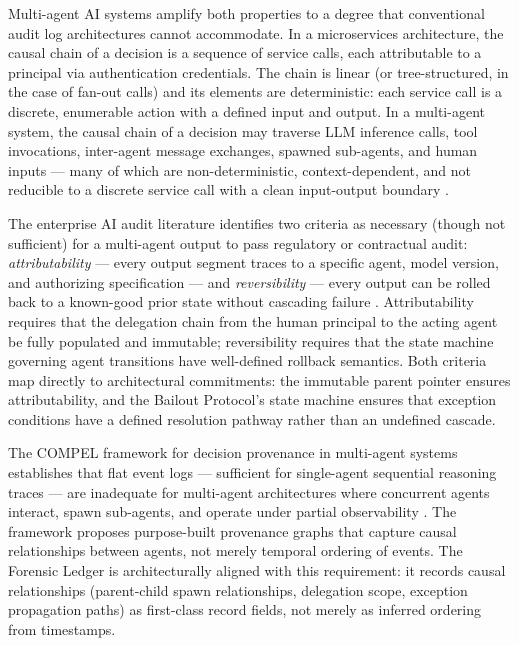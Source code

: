 Multi-agent AI systems amplify both properties to a degree that conventional audit log architectures cannot accommodate. In a microservices architecture, the causal chain of a decision is a sequence of service calls, each attributable to a principal via authentication credentials. The chain is linear (or tree-structured, in the case of fan-out calls) and its elements are deterministic: each service call is a discrete, enumerable action with a defined input and output. In a multi-agent system, the causal chain of a decision may traverse LLM inference calls, tool invocations, inter-agent message exchanges, spawned sub-agents, and human inputs — many of which are non-deterministic, context-dependent, and not reducible to a discrete service call with a clean input-output boundary \cite{arxiv-audit-trails, swept-audit}.

The enterprise AI audit literature identifies two criteria as necessary (though not sufficient) for a multi-agent output to pass regulatory or contractual audit: \emph{attributability} — every output segment traces to a specific agent, model version, and authorizing specification — and \emph{reversibility} — every output can be rolled back to a known-good prior state without cascading failure \cite{augment-audit}. Attributability requires that the delegation chain from the human principal to the acting agent be fully populated and immutable; reversibility requires that the state machine governing agent transitions have well-defined rollback semantics. Both criteria map directly to \bxthree{} architectural commitments: the immutable parent pointer ensures attributability, and the Bailout Protocol's state machine ensures that exception conditions have a defined resolution pathway rather than an undefined cascade.

The COMPEL framework for decision provenance in multi-agent systems establishes that flat event logs — sufficient for single-agent sequential reasoning traces — are inadequate for multi-agent architectures where concurrent agents interact, spawn sub-agents, and operate under partial observability \cite{compel-audit}. The framework proposes purpose-built provenance graphs that capture causal relationships between agents, not merely temporal ordering of events. The \bxthree{} Forensic Ledger is architecturally aligned with this requirement: it records causal relationships (parent-child spawn relationships, delegation scope, exception propagation paths) as first-class record fields, not merely as inferred ordering from timestamps.

